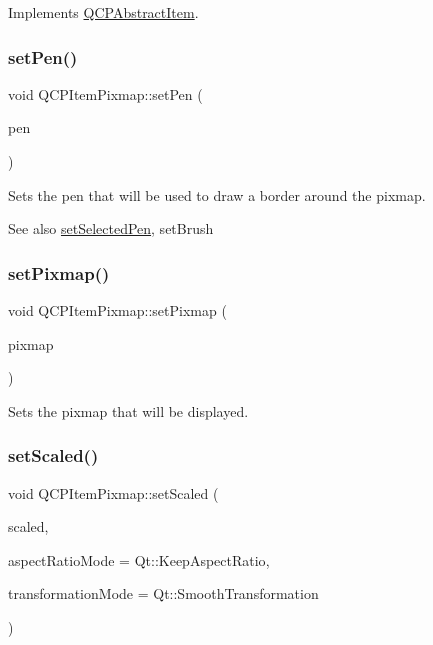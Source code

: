 Implements \hyperlink{class_q_c_p_abstract_item_ae41d0349d68bb802c49104afd100ba2a}{Q\+C\+P\+Abstract\+Item}.

\mbox{\label{class_q_c_p_item_pixmap_acdade1305edb4b5cae14f97fd132065f}} 
\subsubsection{\texorpdfstring{set\+Pen()}{setPen()}}
{\footnotesize\ttfamily void Q\+C\+P\+Item\+Pixmap\+::set\+Pen (\begin{DoxyParamCaption}\item[{const Q\+Pen \&}]{pen }\end{DoxyParamCaption})}

Sets the pen that will be used to draw a border around the pixmap.

\begin{DoxySeeAlso}{See also}
\hyperlink{class_q_c_p_item_pixmap_afc5e479e88e53740176ce77cb70dd67a}{set\+Selected\+Pen}, set\+Brush 
\end{DoxySeeAlso}
\mbox{\label{class_q_c_p_item_pixmap_a726b69ea4025edf48f9b29b6450548a7}} 
\subsubsection{\texorpdfstring{set\+Pixmap()}{setPixmap()}}
{\footnotesize\ttfamily void Q\+C\+P\+Item\+Pixmap\+::set\+Pixmap (\begin{DoxyParamCaption}\item[{const Q\+Pixmap \&}]{pixmap }\end{DoxyParamCaption})}

Sets the pixmap that will be displayed. \mbox{\label{class_q_c_p_item_pixmap_ab4d44529a1c6c8d37d0ea7560e042777}} 
\subsubsection{\texorpdfstring{set\+Scaled()}{setScaled()}}
{\footnotesize\ttfamily void Q\+C\+P\+Item\+Pixmap\+::set\+Scaled (\begin{DoxyParamCaption}\item[{bool}]{scaled,  }\item[{Qt\+::\+Aspect\+Ratio\+Mode}]{aspect\+Ratio\+Mode = {\ttfamily Qt\+:\+:KeepAspectRatio},  }\item[{Qt\+::\+Transformation\+Mode}]{transformation\+Mode = {\ttfamily Qt\+:\+:SmoothTransformation} }\end{DoxyParamCaption})}

